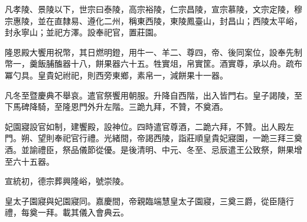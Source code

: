 \begin{pinyinscope}
凡孝陵、景陵以下，世宗曰泰陵，高宗裕陵，仁宗昌陵，宣宗慕陵，文宗定陵，穆宗惠陵，並在直隸易、遵化二州，稱東西陵，東陵鳳臺山，封昌山；西陵太平峪，封永寧山；並祀方澤。設奉祀官，置莊園。

隆恩殿大饗用祝幣，其日燃明鐙，用牛一、羊二、尊四，帝、後同案位，設奉先制幣一，羹飯脯醢器十八，餅果器六十五。牲實俎，帛實筐。酒實尊，承以舟。疏布冪勺具。皇貴妃祔祀，則西旁東鄉，素帛一，減餅果十一器。

凡冬至暨慶典不舉哀。遣官祭饗用朝服。升降自西階，出入皆門右。皇子謁陵，至下馬碑降騎，至隆恩門外升左階。三跪九拜，不贊，不奠酒。

妃園寢設官如制，建饗殿，設神位。四時遣官尊酒，二跪六拜，不贊。出人殿左門。朔、望則奉祀官行禮。光緒間，帝謁西陵，詣莊順皇貴妃寢園，一跪三拜三奠酒。並諭禮臣，祭品儀節從優。是後清明、中元、冬至、忌辰遣王公致祭，餅果增至六十五器。

宣統初，德宗葬興隆峪，號崇陵。

皇太子園寢與妃園寢同。嘉慶間，帝親臨端慧皇太子園寢，三奠三爵，從臣隨行禮，每奠一拜。載其儀入會典云。


\end{pinyinscope}
